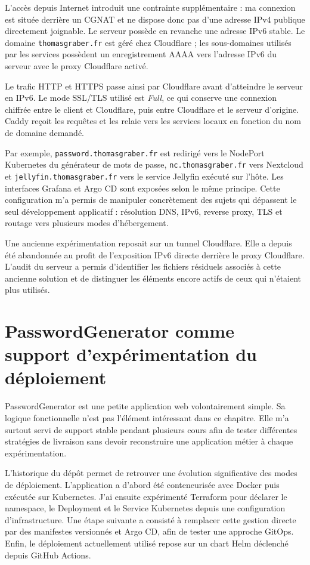 L'accès depuis Internet introduit une contrainte supplémentaire : ma connexion est située derrière un CGNAT et ne dispose donc pas d'une adresse IPv4 publique directement joignable. Le serveur possède en revanche une adresse IPv6 stable. Le domaine \texttt{thomasgraber.fr} est géré chez Cloudflare ; les sous-domaines utilisés par les services possèdent un enregistrement AAAA vers l'adresse IPv6 du serveur avec le proxy Cloudflare activé.

Le trafic HTTP et HTTPS passe ainsi par Cloudflare avant d'atteindre le serveur en IPv6. Le mode SSL/TLS utilisé est \textit{Full}, ce qui conserve une connexion chiffrée entre le client et Cloudflare, puis entre Cloudflare et le serveur d'origine. Caddy reçoit les requêtes et les relaie vers les services locaux en fonction du nom de domaine demandé.

Par exemple, \texttt{password.thomasgraber.fr} est redirigé vers le NodePort Kubernetes du générateur de mots de passe, \texttt{nc.thomasgraber.fr} vers Nextcloud et \texttt{jellyfin.thomasgraber.fr} vers le service Jellyfin exécuté sur l'hôte. Les interfaces Grafana et Argo CD sont exposées selon le même principe. Cette configuration m'a permis de manipuler concrètement des sujets qui dépassent le seul développement applicatif : résolution DNS, IPv6, reverse proxy, TLS et routage vers plusieurs modes d'hébergement.

Une ancienne expérimentation reposait sur un tunnel Cloudflare. Elle a depuis été abandonnée au profit de l'exposition IPv6 directe derrière le proxy Cloudflare. L'audit du serveur a permis d'identifier les fichiers résiduels associés à cette ancienne solution et de distinguer les éléments encore actifs de ceux qui n'étaient plus utilisés.

\section{PasswordGenerator comme support d'expérimentation du déploiement}

PasswordGenerator est une petite application web volontairement simple. Sa logique fonctionnelle n'est pas l'élément intéressant dans ce chapitre. Elle m'a surtout servi de support stable pendant plusieurs cours afin de tester différentes stratégies de livraison sans devoir reconstruire une application métier à chaque expérimentation.

L'historique du dépôt permet de retrouver une évolution significative des modes de déploiement. L'application a d'abord été conteneurisée avec Docker puis exécutée sur Kubernetes. J'ai ensuite expérimenté Terraform pour déclarer le namespace, le Deployment et le Service Kubernetes depuis une configuration d'infrastructure. Une étape suivante a consisté à remplacer cette gestion directe par des manifestes versionnés et Argo CD, afin de tester une approche GitOps. Enfin, le déploiement actuellement utilisé repose sur un chart Helm déclenché depuis GitHub Actions.

